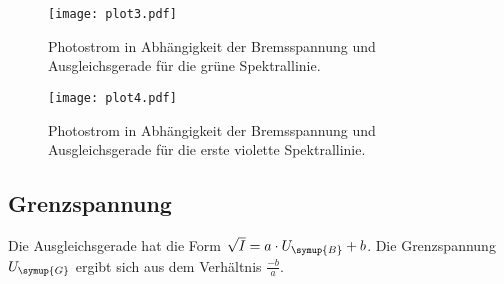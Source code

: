 \begin{figure}[!hbt]
    \centering
    \label{fig:gruen}
    \caption{Photostrom in Abhängigkeit der Bremsspannung und Ausgleichsgerade für die grüne Spektrallinie.}
    \texttt{[image: plot3.pdf]}
\end{figure}

\begin{figure}[!hbt]
    \centering
    \label{fig:violett1}
    \caption{Photostrom in Abhängigkeit der Bremsspannung und Ausgleichsgerade für die erste violette Spektrallinie.}
    \texttt{[image: plot4.pdf]}
\end{figure}

\subsection{Grenzspannung}
\label{sec:Grenzspannung}
Die Ausgleichsgerade hat die Form $\sqrt{I} = a \cdot U_{\symup{B}} + b$. Die Grenzspannung $U_{\symup{G}}$
ergibt sich aus dem Verhältnis $\frac{-b}{a}$.